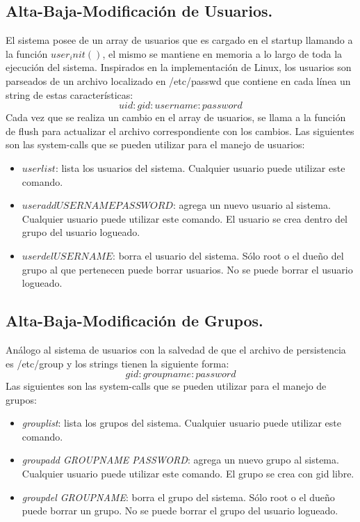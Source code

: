 \documentclass[english]{article}
\begin{document}
\subsection{Alta-Baja-Modificación de Usuarios.}
El sistema posee de un array de usuarios que es cargado en el startup llamando a la función $user_init()$, el mismo se mantiene en memoria a lo largo de toda la ejecución del sistema. Inspirados en la implementación de Linux, los usuarios son parseados de un archivo localizado en /etc/passwd que contiene en cada línea un string de estas características:
$$uid:gid:username:password$$
Cada vez que se realiza un cambio en el array de usuarios, se llama a la función de flush para actualizar el archivo correspondiente con los cambios.
Las siguientes son las system-calls que se pueden utilizar para el manejo de usuarios:
\begin{itemize}

\item $userlist$: lista los usuarios del sistema.
\subitem Cualquier usuario puede utilizar este comando.

\item $useradd USERNAME PASSWORD$: agrega un nuevo usuario al sistema.
\subitem Cualquier usuario puede utilizar este comando.
\subitem El usuario se crea dentro del grupo del usuario logueado.

\item $userdel USERNAME$: borra el usuario del sistema.
\subitem Sólo root o el dueño del grupo al que pertenecen puede borrar usuarios.
\subitem No se puede borrar el usuario logueado.

\end{itemize}
 
\subsection{Alta-Baja-Modificación de Grupos.}
Análogo al sistema de usuarios con la salvedad de que el archivo de persistencia es /etc/group y los strings tienen la siguiente forma:
$$gid:groupname:password$$
Las siguientes son las system-calls que se pueden utilizar para el manejo de grupos:
\begin{itemize}

\item \emph{grouplist}: lista los grupos del sistema.
\subitem Cualquier usuario puede utilizar este comando.

\item \emph{groupadd GROUPNAME PASSWORD}: agrega un nuevo grupo al sistema.
\subitem Cualquier usuario puede utilizar este comando.
\subitem El grupo se crea con gid libre.

\item \emph{groupdel GROUPNAME}: borra el grupo del sistema.
\subitem Sólo root o el dueño puede borrar un grupo.
\subitem No se puede borrar el grupo del usuario logueado.

\end{itemize}
\end{document}
